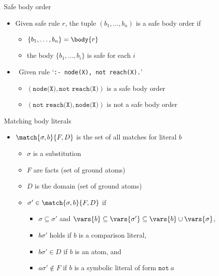 \begin{frame}{Safe body order}
  \bigskip
  \begin{itemize}
  \item Given safe rule \(r\), the tuple \((b_1, \dots, b_n)\) is a \alert{safe body order} if
    \begin{itemize}\normalsize
    \item \(\{ b_1 ,\dots , b_n \} = \body{r} \)
      \smallskip
    \item the body \(\{b_1, \dots, b_i\}\) is safe for each \(i\)
    \end{itemize}
    \bigskip
  \item<2->  \ Given rule `\texttt{:- node(X), not reach(X).}'
    \begin{itemize}\normalsize
    \item \((\texttt{node(X)}, \texttt{not reach(X)})\) is a safe body order
      \smallskip
    \item \((\texttt{not reach(X)}, \texttt{node(X)})\) is not a safe body order
    \end{itemize}
  \end{itemize}
\end{frame}
\begin{frame}{Matching body literals}
  \begin{itemize}
  \item \(\match{\sigma,b}{F,D}\) is the set of \alert{all matches for literal} \(b\)
    \begin{itemize}
    \item \(\sigma\) is a substitution
    \item \(F\) are facts (set of ground atoms)
    \item \(D\) is the domain (set of ground atoms)
    \item \(\sigma' \in \match{\sigma,b}{F,D}\) if
      \begin{itemize}\small
      \item \(\sigma \subseteq \sigma'\) and \(\vars{b} \subseteq \vars{\sigma'} \subseteq \vars{b} \cup \vars{\sigma}\),
      \item \(b\sigma'\) holds if \(b\) is a comparison literal,
      \item \(b\sigma' \in D\) if \(b\) is an atom, and
      \item \(a\sigma' \not\in F\) if \(b\) is a symbolic literal of form \(\texttt{not}\ a\)
      \end{itemize}
    \end{itemize}
  \end{itemize}
\end{frame}
